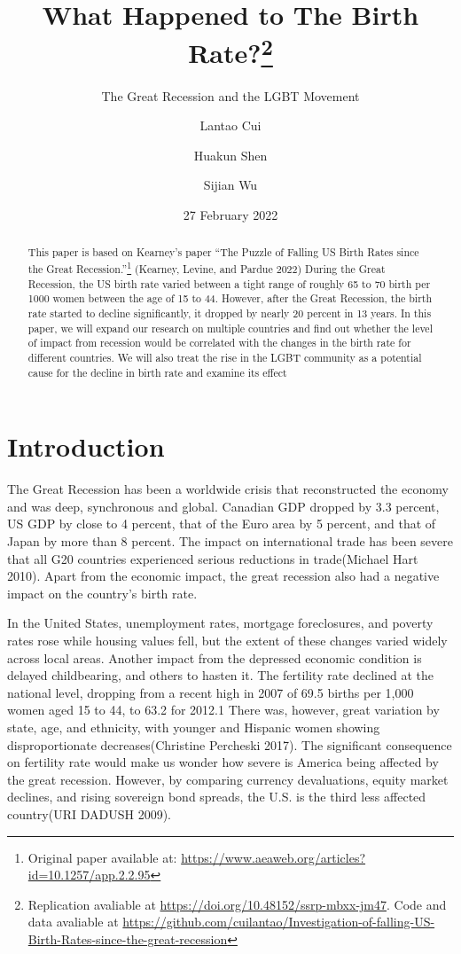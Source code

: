 \documentclass[
]{article}
\title{What Happened to The Birth Rate?\thanks{Replication avaliable at \url{https://doi.org/10.48152/ssrp-mbxx-jm47}. Code and data avaliable at \url{https://github.com/cuilantao/Investigation-of-falling-US-Birth-Rates-since-the-great-recession}}}
\subtitle{The Great Recession and the LGBT Movement}
\author{Lantao Cui \and Huakun Shen \and Sijian Wu}
\date{27 February 2022}
\begin{document}
\maketitle
\begin{abstract}
This paper is based on Kearney's paper ``The Puzzle of Falling US Birth Rates since the Great Recession.''\footnote{Original paper available at: \url{https://www.aeaweb.org/articles?id=10.1257/app.2.2.95}} (Kearney, Levine, and Pardue 2022) During the Great Recession, the US birth rate varied between a tight range of roughly 65 to 70 birth per 1000 women between the age of 15 to 44. However, after the Great Recession, the birth rate started to decline significantly, it dropped by nearly 20 percent in 13 years. In this paper, we will expand our research on multiple countries and find out whether the level of impact from recession would be correlated with the changes in the birth rate for different countries. We will also treat the rise in the LGBT community as a potential cause for the decline in birth rate and examine its effect
\end{abstract}

\hypertarget{introduction}{%
\section{Introduction}\label{introduction}}

The Great Recession has been a worldwide crisis that reconstructed the economy and was deep, synchronous and global. Canadian GDP dropped by 3.3 percent, US GDP by close to 4 percent, that of the Euro area by 5 percent, and that of Japan by more than 8 percent. The impact on international trade has been severe that all G20 countries experienced serious reductions in trade(Michael Hart 2010). Apart from the economic impact, the great recession also had a negative impact on the country's birth rate.

In the United States, unemployment rates, mortgage foreclosures, and poverty rates rose while housing values fell, but the extent of these changes varied widely across local areas. Another impact from the depressed economic condition is delayed childbearing, and others to hasten it. The fertility rate declined at the national level, dropping from a recent high in 2007 of 69.5 births per 1,000 women aged 15 to 44, to 63.2 for 2012.1 There was, however, great variation by state, age, and ethnicity, with younger and Hispanic women showing disproportionate decreases(Christine Percheski 2017). The significant consequence on fertility rate would make us wonder how severe is America being affected by the great recession. However, by comparing currency devaluations, equity market declines, and rising sovereign bond spreads, the U.S. is the third less affected country(URI DADUSH 2009).
\end{document}

